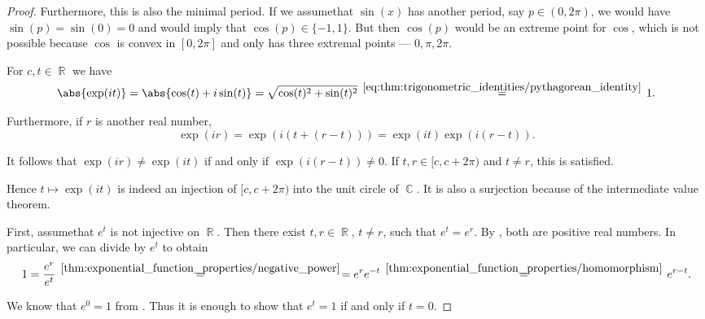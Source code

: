 \begin{proof}
  Furthermore, this is also the minimal period. If we assume\DNE that \( \sin(x) \) has another period, say \( p \in (0, 2\pi) \), we would have \( \sin(p) = \sin(0) = 0 \) and  would imply that \( \cos(p) \in \{ -1, 1 \} \). But then \( \cos(p) \) would be an extreme point for \( \cos \), which is not possible because \( \cos \) is convex in \( [0, 2\pi] \) and only has three extremal points --- \( 0, \pi, 2\pi \).

   For \( c, t \in \BbbR \) we have
  \begin{equation*}
    \abs{\exp(it)}
    =
    \abs{\cos(t) + i\sin(t)}
    =
    \sqrt{\cos(t)^2 + \sin(t)^2}
    \reloset {\eqref{eq:thm:trigonometric_identities/pythagorean_identity}} =
    1.
  \end{equation*}

  Furthermore, if \( r \) is another real number,
  \begin{equation}
    \exp(ir)
    =
    \exp(i(t + (r - t)))
    =
    \exp(it) \exp(i(r - t)).
  \end{equation}

  It follows that \( \exp(ir) \neq \exp(it) \) if and only if \( \exp(i(r - t)) \neq 0 \). If \( t, r \in [c, c + 2\pi) \) and \( t \neq r \), this is satisfied.

  Hence \( t \mapsto \exp(it) \) is indeed an injection of \( [c, c + 2\pi) \) into the unit circle of \( \BbbC \). It is also a surjection because of the intermediate value theorem.

   First, assume\DNE that \( e^t \) is not injective on \( \BbbR \). Then there exist \( t, r \in \BbbR \), \( t \neq r \), such that \( e^t = e^r \). By , both are positive real numbers. In particular, we can divide by \( e^t \) to obtain
  \begin{equation*}
    1
    =
    \frac {e^r} {e^t}
    \reloset {\ref{thm:exponential_function_properties/negative_power}} =
    =
    e^r e^{-t}
    \reloset {\ref{thm:exponential_function_properties/homomorphism}} =
    e^{r - t}.
  \end{equation*}

  We know that \( e^0 = 1 \) from . Thus it is enough to show that \( e^t = 1 \) if and only if \( t = 0 \).


\end{proof}
